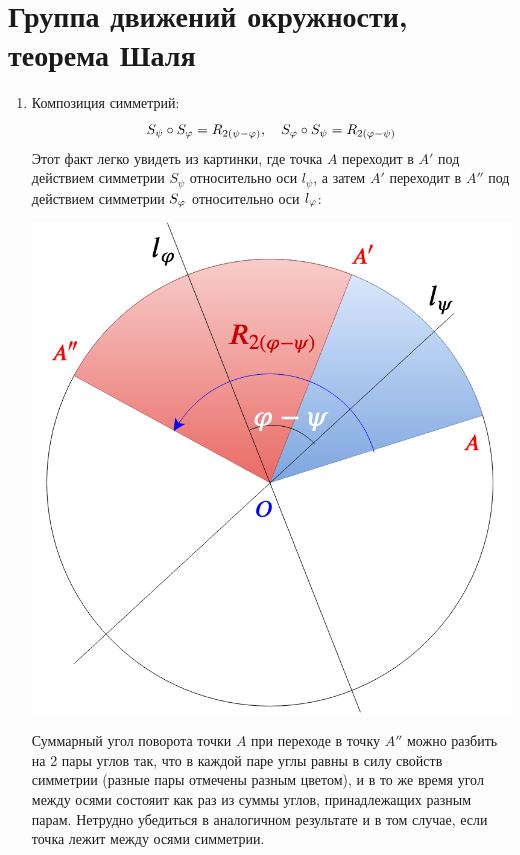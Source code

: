 \section{Группа движений окружности, теорема Шаля}


\begin{enumerate}\setlength{\itemsep}{1pt}
\item Композиция симметрий: 
$$
S_\psi\circ S_\varphi=R_{2(\psi-\varphi)},\quad S_\varphi\circ S_\psi=R_{2(\varphi-\psi)}
$$
Этот факт легко увидеть из картинки, где точка $A$ переходит в $A'$ под действием симметрии $S_\psi$ относительно оси $l_\psi$, а затем $A'$ переходит в $A''$ под действием симметрии $S_\varphi$ относительно оси $l_\varphi$:

\begin{center}
\includegraphics[scale=0.25]{Rund.png}
\end{center}

Суммарный угол поворота точки $A$ при переходе в точку $A''$ можно разбить на 2 пары углов так, что в каждой паре углы равны в силу свойств симметрии (разные пары отмечены разным цветом), и в то же время угол между осями состояит как раз из суммы углов, принадлежащих разным парам. Нетрудно убедиться в аналогичном результате и в том случае, если точка лежит между осями симметрии.


\end{enumerate}
